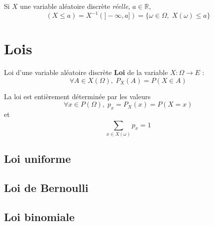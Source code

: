 \begin{Definition}[colbacktitle=red!75!black]{}{}
Si $X$ une variable aléatoire discrète \textit{réelle}, $a \in \mathbb{R}$, 
\begin{equation}
  (X \le a) = X ^{-1}(]- \infty
  , a]) = \{ \omega \in \Omega, \; X(\omega) \le a\}
\end{equation}
\end{Definition}







\section{Lois} %

\begin{Definition}[colbacktitle=red!75!black]{Loi d'une variable aléatoire discrète}{}
\textbf{Loi} de la variable $X : \Omega \to E$ :
\begin{equation}
  \forall A \in X(\Omega), \; P_X(A) = P(X \in A)
\end{equation}

\end{Definition}

\begin{Corollary}{}{}
La loi est entièrement déterminée par les valeurs
\begin{equation}
\forall x \in P(\Omega),\;  p_x = P_X(x) = P(X = x)
\end{equation}
et 
\begin{equation}
  \sum_{x \in X(\omega)}^{} p_x = 1
\end{equation}
\end{Corollary}




\subsection{Loi uniforme} %
\label{sub:Loi uniforme}

\subsection{Loi de Bernoulli} %
\label{sub:Loi de Bernoulli}

\subsection{Loi binomiale} %
\label{sub:Loi binomiale}


